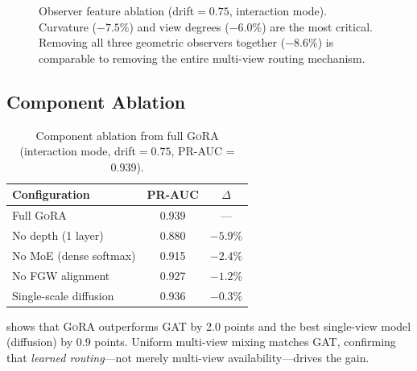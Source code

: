 \documentclass[11pt,a4paper]{article}
\newcommand{\ours}{\textsc{GoRA}}  %
\begin{document}
\begin{figure}[t]
\centering
{}
\caption{Observer feature ablation (drift${}=0.75$, interaction mode).
Curvature ($-7.5\%$) and view degrees ($-6.0\%$) are the most critical.
Removing all three geometric observers together ($-8.6\%$) is
comparable to removing the entire multi-view routing mechanism.}
\label{fig:observer_ablation}
\end{figure}

\subsection{Component Ablation}
\label{sec:ablation_components}

\begin{table}[t]
\centering
\caption{Component ablation from full \ours{} (interaction mode,
drift${}=0.75$, PR-AUC = 0.939).}
\label{tab:ablation}
\begin{tabular}{@{}lcc@{}}
\toprule
Configuration & PR-AUC & $\Delta$ \\
\midrule
Full \ours{} & 0.939 & --- \\
No depth (1 layer) & 0.880 & $-5.9\%$ \\
No MoE (dense softmax) & 0.915 & $-2.4\%$ \\
No FGW alignment & 0.927 & $-1.2\%$ \\
Single-scale diffusion & 0.936 & $-0.3\%$ \\
\bottomrule
\end{tabular}
\end{table}

 shows that \ours{} outperforms GAT by
2.0 points and the best single-view model (diffusion) by 0.9 points.
Uniform multi-view mixing matches GAT, confirming that
\emph{learned routing}---not merely multi-view availability---drives
the gain.
\end{document}
